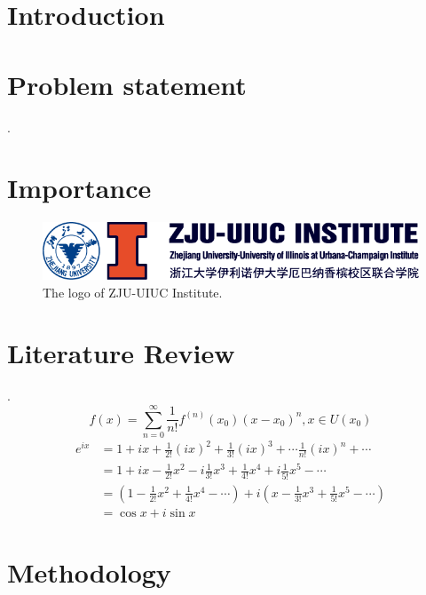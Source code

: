 \documentclass{zjui-report-simple}
\begin{document}
\makecoverpage

\section{Introduction}
\section{Problem statement}
\lipsum[1]\cite{li1999,haynes1951}.
\section{Importance}
\begin{figure}[H]
    \centering
    \includegraphics[width=0.4\linewidth]{LOGO2.png}
    \caption{The logo of ZJU-UIUC Institute.}
    \label{fig:logo}
\end{figure}

\section{Literature Review}
\lipsum[2]\cite{j.a.prufrock2009,li1999,ref1}.
\begin{equation}
    f\left( x \right) =\sum_{n=0}^{\infty}{\frac{1}{n!}f^{\left( n \right)}\left( x_0 \right) \left( x-x_0 \right) ^n}, x\in U\left( x_0 \right)
\end{equation}
\begin{equation}
    \begin{aligned}
        e^{ix} & =1+ix+\frac{1}{2!}\left( ix \right) ^2+\frac{1}{3!}\left( ix \right) ^3+\cdots \frac{1}{n!}\left( ix \right) ^n+\cdots
        \\
               & =1+ix-\frac{1}{2!}x^2-i\frac{1}{3!}x^3+\frac{1}{4!}x^4+i\frac{1}{5!}x^5-\cdots
        \\
               & =\left( 1-\frac{1}{2!}x^2+\frac{1}{4!}x^4-\cdots \right) +i\left( x-\frac{1}{3!}x^3+\frac{1}{5!}x^5-\cdots \right)
        \\
               & =\cos x+i\sin x
    \end{aligned}
\end{equation}
\section{Methodology}
\end{document}
